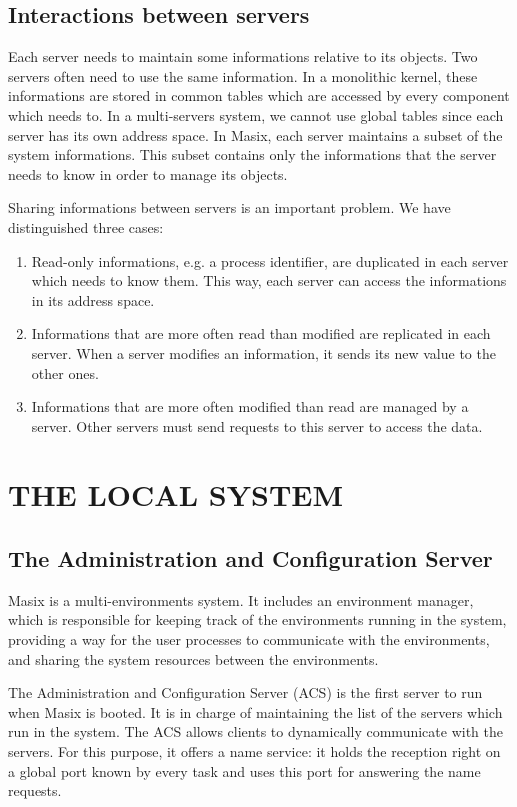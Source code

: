 \subsection {Interactions between servers}

	Each server needs to maintain some informations relative to its
objects. Two servers often need to use the same information. In a monolithic
kernel, these informations are stored in common tables which are accessed by
every component which needs to. In a multi-servers system, we cannot use global
tables since each server has its own address space. In Masix, each server
maintains a subset of the system informations. This subset contains only the
informations that the server needs to know in order to manage its objects.

	Sharing informations between servers is an important problem. We have
distinguished three cases:
\begin {enumerate}
\item Read-only informations, e.g. a process identifier, are duplicated in
each server which needs to know them. This way, each server can access the
informations in its address space.
\item Informations that are more often read than modified are replicated in
each server. When a server modifies an information, it sends its new value to
the other ones.
\item Informations that are more often modified than read are managed by a
server. Other servers must send requests to this server to access the data.
\end {enumerate}

\section {THE LOCAL SYSTEM}

\subsection {The Administration and Configuration Server}

	Masix is a multi-environments system. It includes an environment
manager, which is responsible for keeping track of the environments running
in the system, providing a way for the user processes to communicate with the
environments, and sharing the system resources between the environments.

	The Administration and Configuration Server (ACS) is the first server
to run when Masix is booted. It is in charge of maintaining the list of
the servers which run in the system. The ACS allows clients to dynamically
communicate with the servers. For this purpose, it offers a name service: it
holds the reception right on a global port known by every task and uses this
port for answering the name requests.

